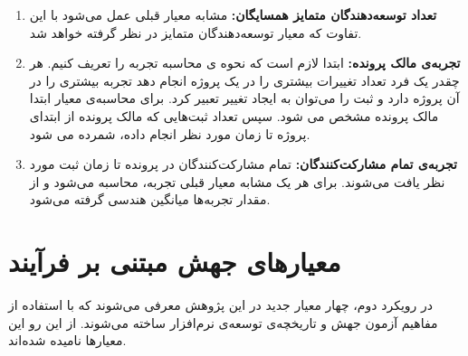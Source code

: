 \begin{enumerate}
\item
\textbf{تعداد توسعه‌دهندگان متمایز همسایگان:}
مشابه معیار قبلی عمل می‌شود با این تفاوت که معیار توسعه‌دهندگان متمایز در نظر گرفته خواهد شد.
\item
\textbf{تجربه‌ی مالک پرونده:}
 ابتدا لازم است که نحوه ی محاسبه تجربه را تعریف کنیم. هر چقدر یک فرد تعداد تغییرات بیشتری را در یک پروژه انجام دهد تجربه بیشتری را در آن پروژه دارد و ثبت را می‌توان به ایجاد تغییر تعبیر کرد. برای محاسبه‌ی معیار ابتدا مالک پرونده مشخص می شود. سپس تعداد ثبت‌هایی که مالک پرونده از ابتدای پروژه تا زمان مورد نظر انجام داده، شمرده می شود.
\item
\textbf{تجربه‌ی تمام مشارکت‌کنندگان:}
تمام مشارکت‌کنندگان در پرونده تا زمان ثبت مورد نظر یافت می‌شوند. برای هر یک مشابه معیار قبلی تجربه، محاسبه می‌شود و از مقدار تجربه‌ها میانگین هندسی گرفته می‌شود. 

\end{enumerate}


\section{معیارهای جهش مبتنی بر فرآیند}
\label{sec:method-phase-two}
در رویکرد دوم، چهار معیار جدید در این پژوهش معرفی می‌شوند که با استفاده از مفاهیم آزمون جهش و تاریخچه‌ی توسعه‌ی نرم‌افزار ساخته می‌شوند. از این رو این معیارها   نامیده شده‌اند. 

